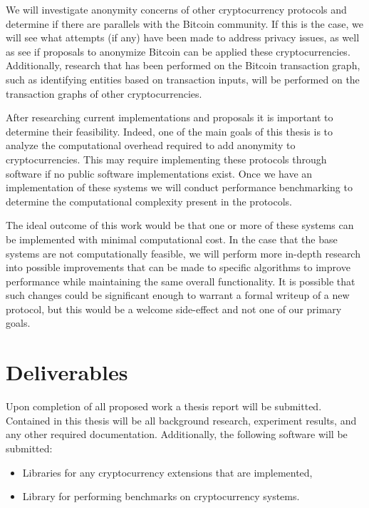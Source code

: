 \documentclass[11pt]{article}
\begin{document}
We will investigate anonymity concerns of other cryptocurrency protocols and
determine if there are parallels with the Bitcoin community. If this is the
case, we will see what attempts (if any) have been made to address privacy
issues, as well as see if proposals to anonymize Bitcoin can be applied these
cryptocurrencies. Additionally, research that has been performed on the Bitcoin
transaction graph, such as identifying entities based on transaction inputs,
will be performed on the transaction graphs of other cryptocurrencies.

After researching current implementations and proposals it is important to
determine their feasibility. Indeed, one of the main goals of this thesis is to
analyze the computational overhead required to add anonymity to
cryptocurrencies. This may require implementing these protocols through software
if no public software implementations exist. Once we have an implementation of
these systems we will conduct performance benchmarking to determine the
computational complexity present in the protocols.

The ideal outcome of this work would be that one or more of these systems can be
implemented with minimal computational cost. In the case that the base
systems are not computationally feasible, we will perform more in-depth research
into possible improvements that can be made to specific algorithms to improve
performance while maintaining the same overall functionality. It is possible
that such changes could be significant enough to warrant a formal writeup of a
new protocol, but this would be a welcome side-effect and not one of our
primary goals.

\section{Deliverables}
Upon completion of all proposed work a thesis report will be submitted.
Contained in this thesis will be all background research, experiment results,
and any other required documentation. Additionally, the following software will
be submitted:
\begin{itemize}
    \item Libraries for any cryptocurrency extensions that are implemented,
    \item Library for performing benchmarks on cryptocurrency systems.
\end{itemize}
\end{document}
